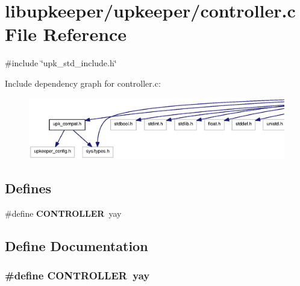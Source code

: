 \section{libupkeeper/upkeeper/controller.c File Reference}
\label{libupkeeper_2upkeeper_2controller_8c}
{\ttfamily \#include \char`\"{}upk\_\-std\_\-include.h\char`\"{}}\par
Include dependency graph for controller.c:
\nopagebreak
\begin{figure}[H]
\begin{center}
\leavevmode
\includegraphics[width=400pt]{libupkeeper_2upkeeper_2controller_8c__incl}
\end{center}
\end{figure}
\subsection*{Defines}
\begin{DoxyCompactItemize}
\item 
\#define {\bf CONTROLLER}~yay
\end{DoxyCompactItemize}


\subsection{Define Documentation}
\subsubsection[{CONTROLLER}]{\setlength{\rightskip}{0pt plus 5cm}\#define CONTROLLER~yay}\label{libupkeeper_2upkeeper_2controller_8c_a6fa0e88c2f73f4e656831351dfdbf6e5}
